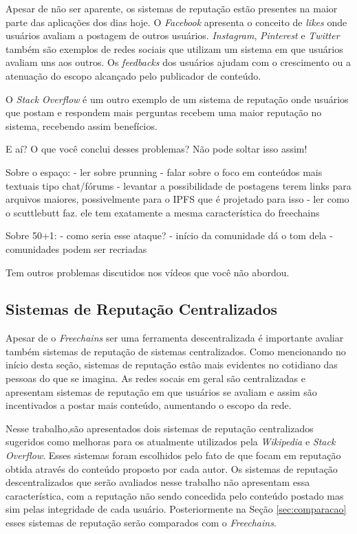 \documentclass[12pt]{article}
\newcommand{\FC} {\emph{Freechains}\xspace}
\begin{document}
Apesar de não ser aparente, os sistemas de reputação estão presentes na maior parte das aplicações dos dias hoje. O \emph{Facebook} apresenta o conceito de \emph{likes} onde usuários avaliam a postagem de outros usuários. \emph{Instagram}, \emph{Pinterest} e \emph{Twitter} também são exemplos de redes sociais que utilizam um sistema em que usuários avaliam uns aos outros. Os \emph{feedbacks} dos usuários ajudam com o crescimento ou a atenuação do escopo alcançado pelo publicador de conteúdo.  

O \emph{Stack Overflow} é um outro exemplo de um sistema de reputação onde usuários que postam e respondem mais perguntas recebem uma maior reputação no sistema, recebendo assim benefícios.

E aí? O que você conclui desses problemas? Não pode soltar isso assim!

Sobre o espaço:
    - ler sobre prunning
    - falar sobre o foco em conteúdos mais textuais tipo chat/fórums
    - levantar a possibilidade de postagens terem links para arquivos maiores, possivelmente para o IPFS que é projetado para isso
    - ler como o scuttlebutt faz. ele tem exatamente a mesma característica do freechains

Sobre 50+1:
    - como seria esse ataque?
    - início da comunidade dá o tom dela
    - comunidades podem ser recriadas

Tem outros problemas discutidos nos vídeos que você não abordou.

\subsection{Sistemas de Reputação Centralizados} \label{subsec:SRCentra}

Apesar de o \FC ser uma ferramenta descentralizada é importante avaliar também sistemas de reputação de sistemas centralizados. Como mencionando no início desta seção, sistemas de reputação estão mais evidentes no cotidiano das pessoas do que se imagina. As redes socais em geral são centralizadas e apresentam sistemas de reputação em que usuários se avaliam e assim são incentivados a postar mais conteúdo, aumentando o escopo da rede.

Nesse trabalho,são apresentados dois sistemas de reputação centralizados sugeridos como melhoras para os atualmente utilizados pela \emph{Wikipedia} e \emph{Stack Overflow}. Esses sistemas foram escolhidos pelo fato de que focam em reputação obtida através do conteúdo proposto por cada autor. Os sistemas de reputação descentralizados que serão avaliados nesse trabalho não apresentam essa característica, com a reputação não sendo concedida pelo conteúdo postado mas sim pelas integridade de cada usuário. Posteriormente na Seção \ref{sec:comparacao} esses sistemas de reputação serão comparados com o \FC. 
\end{document}
